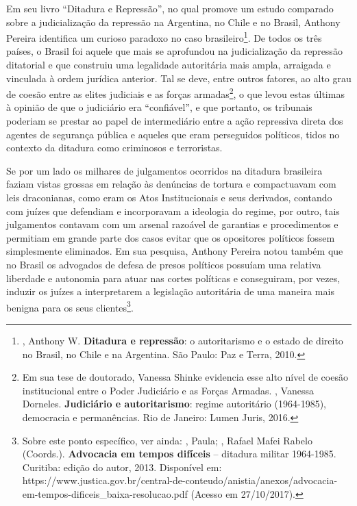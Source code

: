Em seu livro ``Ditadura e Repressão'', no qual promove um estudo
comparado sobre a judicialização da repressão na Argentina, no Chile e
no Brasil, Anthony Pereira identifica um curioso paradoxo no caso
brasileiro\footnote{, Anthony W. \textbf{Ditadura e repressão}: o
  autoritarismo e o estado de direito no Brasil, no Chile e na
  Argentina. São Paulo: Paz e Terra, 2010.}. De todos os três países, o
Brasil foi aquele que mais se aprofundou na judicialização da repressão
ditatorial e que construiu uma legalidade autoritária mais ampla,
arraigada e vinculada à ordem jurídica anterior. Tal se deve, entre
outros fatores, ao alto grau de coesão entre as elites judiciais e as
forças armadas\footnote{Em sua tese de doutorado, Vanessa Shinke
  evidencia esse alto nível de coesão institucional entre o Poder
  Judiciário e as Forças Armadas. , Vanessa Dorneles.
  \textbf{Judiciário e autoritarismo}: regime autoritário (1964-1985),
  democracia e permanências. Rio de Janeiro: Lumen Juris, 2016.}, o que
levou estas últimas à opinião de que o judiciário era ``confiável'', e
que portanto, os tribunais poderiam se prestar ao papel de intermediário
entre a ação repressiva direta dos agentes de segurança pública e
aqueles que eram perseguidos políticos, tidos no contexto da ditadura
como criminosos e terroristas.

Se por um lado os milhares de julgamentos ocorridos na ditadura
brasileira faziam vistas grossas em relação às denúncias de tortura e
compactuavam com leis draconianas, como eram os Atos Institucionais e
seus derivados, contando com juízes que defendiam e incorporavam a
ideologia do regime, por outro, tais julgamentos contavam com um arsenal
razoável de garantias e procedimentos e permitiam em grande parte dos
casos evitar que os opositores políticos fossem simplesmente eliminados.
Em sua pesquisa, Anthony Pereira notou também que no Brasil os advogados
de defesa de presos políticos possuíam uma relativa liberdade e
autonomia para atuar nas cortes políticas e conseguiram, por vezes,
induzir os juízes a interpretarem a legislação autoritária de uma
maneira mais benigna para os seus clientes\footnote{Sobre este ponto
  específico, ver ainda: , Paula; , Rafael Mafei Rabelo
  (Coords.). \textbf{Advocacia em tempos difíceis} -- ditadura militar
  1964-1985. Curitiba: edição do autor, 2013. Disponível em:
  https://www.justica.gov.br/central-de-conteudo/anistia/anexos/advocacia-em-tempos-dificeis\_baixa-resolucao.pdf
  (Acesso em 27/10/2017).}.

